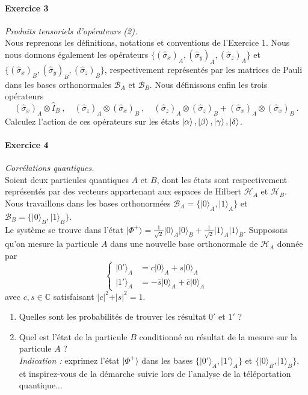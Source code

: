\paragraph{Exercice 3} \textit{Produits tensoriels d'opérateurs (2).} \\
Nous reprenons les définitions, notations et conventions de l'Exercice 1. Nous nous donnons également les opérateurs $\lbrace (\hat \sigma_x)_A, (\hat \sigma_y)_A,(\hat \sigma_z)_A\rbrace$ et $\lbrace (\hat \sigma_x)_B,(\hat \sigma_y)_B,(\hat \sigma_z)_B\rbrace$, respectivement représentés par les matrices de Pauli dans les bases orthonormales $\mathcal B_A$ et $\mathcal B_B$. Nous définissons enfin les trois opérateurs
\begin{equation}
(\hat\sigma_x)_A\otimes \hat I_B\ , \quad (\hat\sigma_z)_A\otimes (\hat \sigma_x)_B\ , \quad (\hat \sigma_z)_A\otimes (\hat \sigma_z)_B + (\hat \sigma_x)_A\otimes (\hat \sigma_x)_B\ .
\end{equation}
Calculez l'action de ces opérateurs sur les états $\ket{\alpha},\ket{\beta},\ket{\gamma},\ket{\delta}$.

\paragraph{Exercice 4} \textit{Corrélations quantiques.} \\
Soient deux particules quantiques $A$ et $B$, dont les états sont respectivement représentés par des vecteurs appartenant aux espaces de Hilbert $\mathcal{H}_A$ et $\mathcal H_B$. Nous travaillons dans les bases orthonormées $\mathcal B_A = \{ \vert 0 \rangle_A ,  \vert 1 \rangle_A\}$ et $\mathcal B_B = \{ \vert 0 \rangle_B ,  \vert 1 \rangle_B\}$. \\

Le système se trouve dans l'état $\vert \Phi^+ \rangle = \frac{1}{\sqrt{2}}\vert 0 \rangle_A \vert 0 \rangle_B +   \frac{1}{\sqrt{2}}\vert 1 \rangle_A \vert 1 \rangle_B$. Supposons qu'on mesure la particule $A$ dans une nouvelle base orthonormale de $\mathcal H_A$ donnée par
\begin{equation}
\left\lbrace
\begin{split}
\vert 0'\rangle_A &= c \vert 0 \rangle_A + s \vert 0 \rangle_A \\
\vert 1'\rangle_A &= -\overline{s} \vert 0 \rangle_A + \overline{c} \vert 0 \rangle_A 
\end{split}
\right.
\end{equation}
avec $c,s\in\mathbb C$ satisfaisant $\vert c\vert^2 + \vert s\vert^2=1$.
\begin{enumerate}
\item Quelles sont les probabilités de trouver les résultat $0'$ et $1'$ ?
\item Quel est l'état de la particule $B$ conditionné au résultat de la mesure sur la particule $A$ ? \\
\textit{Indication :} exprimez l'état $\vert \Phi^+ \rangle $ dans les bases $\{ \vert 0'\rangle_A , \vert 1'\rangle_A \}$ et $\{ \vert 0\rangle_B , \vert 1\rangle_B\}$, et inspirez-vous de la démarche suivie lors de l'analyse de la téléportation quantique...
\end{enumerate}



